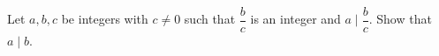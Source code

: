 Let $a,b,c$ be integers with $c\ne0$ such that $\dfrac bc$ is an integer and $a\mid\dfrac bc$. Show that $a\mid b$.
